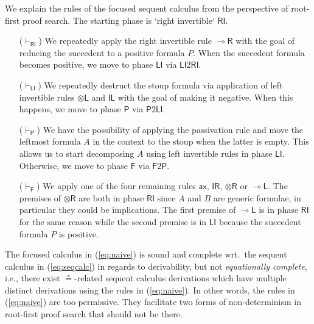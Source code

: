 \documentclass[copyright,creativecommons]{eptcs}
\theoremstyle{definition}
\newcommand{\tl}{\otimes \mathsf{L}}
\newcommand{\tr}{\otimes \mathsf{R}}
\newcommand{\lright}{{\multimap}\mathsf{R}}
\newcommand{\lleft}{{\multimap}\mathsf{L}}
\newcommand{\unitl}{\mathsf{IL}}
\newcommand{\unitr}{\mathsf{IR}}
\newcommand{\ax}{\mathsf{ax}}
\newcommand{\RI}{\mathsf{RI}}
\newcommand{\LI}{\mathsf{LI}}
\newcommand{\Pass}{\mathsf{P}}
\newcommand{\F}{\mathsf{F}}
\begin{document}
We explain the rules of the focused sequent calculus from the perspective of root-first proof search. The starting phase is `right invertible` $\RI$. 
\begin{itemize}
\item[($\vdash_\RI$)] We repeatedly apply the right invertible rule $\lright$ with the goal of reducing the succedent to a positive formula $P$.
  When the succedent formula becomes positive, we move to phase $\LI$ via $\LI2\RI$.
\item[($\vdash_\LI$)] We repeatedly destruct the stoup formula via application of left invertible rules $\tl$ and $\unitl$ with the goal of making it negative. When this happens, we move to phase $\Pass$ via $\Pass2\LI$.
\item[($\vdash_\Pass$)] We have the possibility of applying the passivation rule and move the leftmost formula $A$ in the context to the stoup when the latter is empty. This allows us to start decomposing $A$ using left invertible rules in phase $\LI$. Otherwise, we move to phase $\F$ via $\F2\Pass$.
\item[($\vdash_\F$)] We apply one of the four remaining rules $\ax$, $\unitr$, $\tr$ or $\lleft$. The premises of $\tr$ are both in phase $\RI$ since $A$ and $B$ are generic formulae, in particular they could be implications. The first premise of $\lleft$ is in phase $\RI$ for the same reason while the second premise is in $\LI$ because the succedent formula $P$ is positive.
\end{itemize}

The focused calculus in (\ref{eq:naive}) is sound and complete wrt.\ the sequent calculus in (\ref{eq:seqcalc}) in regards to derivability, but not \emph{equationally complete}, i.e., there exist $\circeq$-related sequent calculus derivations which have multiple distinct derivations using the rules in (\ref{eq:naive}). In other words, the rules in (\ref{eq:naive}) are too permissive. They facilitate two forms of non-determinism in root-first proof search that should not be there.
\end{document}
